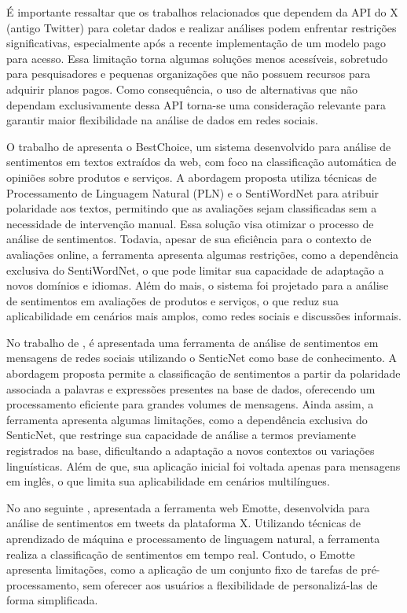 \documentclass[
	12pt,				%
	oneside,			%
	a4paper,			%
	english,			%
	french,				%
	spanish,			%
	brazil				%
	]{abntex2}
\begin{document}
É importante ressaltar que os trabalhos relacionados que dependem da API
do X (antigo Twitter) para coletar dados e realizar análises podem
enfrentar restrições significativas, especialmente após a recente
implementação de um modelo pago para acesso. Essa limitação torna
algumas soluções menos acessíveis, sobretudo para pesquisadores e
pequenas organizações que não possuem recursos para adquirir planos
pagos. Como consequência, o uso de alternativas que não dependam
exclusivamente dessa API torna-se uma consideração relevante para
garantir maior flexibilidade na análise de dados em redes sociais.

O trabalho de  apresenta o BestChoice, um
sistema desenvolvido para análise de sentimentos em textos extraídos da
web, com foco na classificação automática de opiniões sobre produtos e
serviços. A abordagem proposta utiliza técnicas de Processamento de
Linguagem Natural (PLN) e o SentiWordNet para atribuir polaridade aos
textos, permitindo que as avaliações sejam classificadas sem a
necessidade de intervenção manual. Essa solução visa otimizar o processo
de análise de sentimentos. Todavia, apesar de sua eficiência para o
contexto de avaliações online, a ferramenta apresenta algumas
restrições, como a dependência exclusiva do SentiWordNet, o que pode
limitar sua capacidade de adaptação a novos domínios e idiomas. Além do
mais, o sistema foi projetado para a análise de sentimentos em
avaliações de produtos e serviços, o que reduz sua aplicabilidade em
cenários mais amplos, como redes sociais e discussões informais.

No trabalho de , é apresentada uma
ferramenta de análise de sentimentos em mensagens de redes sociais
utilizando o SenticNet como base de conhecimento. A abordagem proposta
permite a classificação de sentimentos a partir da polaridade associada
a palavras e expressões presentes na base de dados, oferecendo um
processamento eficiente para grandes volumes de mensagens. Ainda assim,
a ferramenta apresenta algumas limitações, como a dependência exclusiva
do SenticNet, que restringe sua capacidade de análise a termos
previamente registrados na base, dificultando a adaptação a novos
contextos ou variações linguísticas. Além de que, sua aplicação inicial
foi voltada apenas para mensagens em inglês, o que limita sua
aplicabilidade em cenários multilíngues.

No ano seguinte , apresentada a
ferramenta web Emotte, desenvolvida para análise de sentimentos em
tweets da plataforma X. Utilizando técnicas de aprendizado de máquina e
processamento de linguagem natural, a ferramenta realiza a classificação
de sentimentos em tempo real. Contudo, o Emotte apresenta limitações,
como a aplicação de um conjunto fixo de tarefas de pré-processamento,
sem oferecer aos usuários a flexibilidade de personalizá-las de forma
simplificada.
\end{document}
